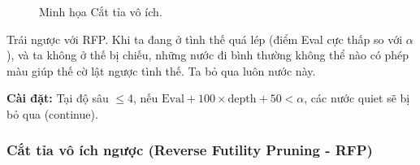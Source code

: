 \begin{figure}[H]
    \caption{Minh họa Cắt tỉa vô ích.}
    \label{fig:futility_pruning}
\end{figure}
Trái ngược với RFP. Khi ta đang ở tình thế quá lép (điểm Eval cực thấp so với $\alpha$), và ta không ở thế bị chiếu, những nước đi bình thường không thể nào có phép màu giúp thế cờ lật ngược tình thế. Ta bỏ qua luôn nước này.

\textbf{Cài đặt:} Tại độ sâu $\le 4$, nếu $\text{Eval} + 100 \times \text{depth} + 50 < \alpha$, các nước quiet sẽ bị bỏ qua (continue).

\subsubsection{Cắt tỉa vô ích ngược (Reverse Futility Pruning - RFP)}

